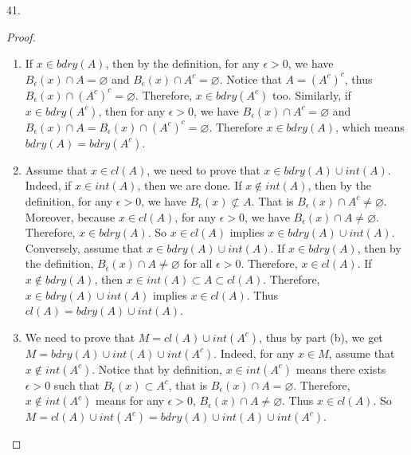 \documentclass[12pt, a4paper]{article}
\theoremstyle{plain}
\begin{document}
41.
\begin{proof}
\hfill
\begin{enumerate}[label=(\alph*)]
\item If $x\in bdry(A)$, then by the definition, for any $\epsilon>0$, we have $B_\epsilon(x)\cap A=\varnothing$ and $B_\epsilon(x)\cap A^c=\varnothing$. Notice that $A=(A^c)^c$, thus $B_\epsilon(x)\cap (A^c)^c=\varnothing$. Therefore, $x\in bdry(A^c)$ too. Similarly, if $x\in bdry(A^c)$, then for any $\epsilon>0$, we have $B_\epsilon	(x)\cap A^c=\varnothing$ and $B_\epsilon(x)\cap A= B_\epsilon(x)\cap (A^c)^c=\varnothing$. Therefore $x\in bdry (A)$, which means $bdry(A)=bdry(A^c)$. 

\item Assume that $x\in cl(A)$, we need to prove that $x\in bdry(A)\cup int(A)$. Indeed, if $x\in int(A)$, then we are done. If $x\notin int(A)$, then by the definition, for any $\epsilon>0$, we have $B_\epsilon(x)\not\subset A$. That is $B_\epsilon(x)\cap A^c\neq \varnothing$. Moreover, because $x\in cl(A)$, for any $\epsilon>0$, we have $B_\epsilon(x)\cap A\neq \varnothing$. Therefore, $x\in bdry(A)$. So $x\in cl(A)$ implies $x\in bdry(A)\cup int(A)$. Conversely, assume that $x\in bdry(A)\cup int(A)$. If $x\in bdry(A)$, then by the definition, $B_\epsilon(x)\cap A\neq \varnothing$ for all $\epsilon>0$. Therefore, $x\in cl(A)$. If $x\notin bdry(A)$, then $x\in int(A)\subset A\subset cl(A)$. Therefore, $x\in bdry(A)\cup int(A)$ implies $x\in cl(A)$. Thus $cl(A)=bdry(A)\cup int(A)$.

\item We need to prove that $M=cl(A)\cup int(A^c)$, thus by part (b), we get $M=bdry(A)\cup int(A)\cup int(A^c)$. Indeed, for any $x\in M$, assume that $x\notin int(A^c)$. Notice that by definition, $x\in int(A^c)$ means there exists $\epsilon>0$ such that $B_\epsilon(x)\subset A^c$, that is $B_\epsilon(x)\cap A=\varnothing$. Therefore, $x\notin int(A^c)$ means for any $\epsilon>0$, $B_\epsilon(x)\cap A\neq \varnothing$. Thus $x\in cl(A)$. So $M=cl(A)\cup int(A^c)=bdry(A)\cup int(A)\cup int(A^c)$.
\end{enumerate}
\end{proof}

\pagebreak 
\end{document}
